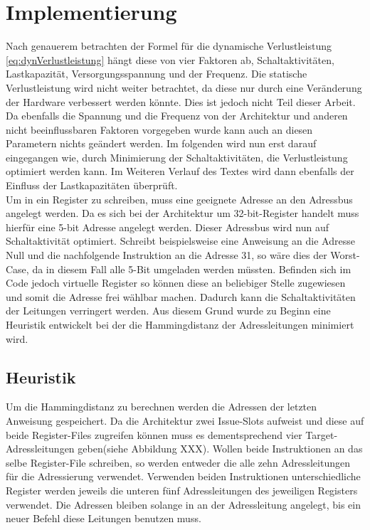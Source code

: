 \chapter{Implementierung}
\label{chap:Implementierung}

Nach genauerem betrachten der Formel für die dynamische Verlustleistung \ref{eq:dynVerlustleistung} hängt diese von vier Faktoren ab, Schaltaktivitäten,  Lastkapazität, Versorgungsspannung und der Frequenz. Die statische Verlustleistung wird nicht weiter betrachtet, da diese nur durch eine Veränderung der Hardware verbessert werden könnte. Dies ist jedoch nicht Teil dieser Arbeit. Da ebenfalls die Spannung und die Frequenz von der Architektur und anderen nicht beeinflussbaren Faktoren vorgegeben wurde kann auch an diesen Parametern nichts geändert werden. Im folgenden wird nun erst darauf eingegangen wie, durch Minimierung der Schaltaktivitäten, die Verlustleistung optimiert werden kann. Im Weiteren Verlauf des Textes wird dann ebenfalls der Einfluss der Lastkapazitäten überprüft.\\
Um in ein Register zu schreiben, muss eine geeignete Adresse an den Adressbus angelegt werden. Da es sich bei der Architektur um 32-bit-Register handelt muss hierfür eine 5-bit Adresse angelegt werden. Dieser Adressbus wird nun auf Schaltaktivität optimiert. Schreibt beispielsweise eine Anweisung an die Adresse Null und die nachfolgende Instruktion an die Adresse 31, so wäre dies der Worst-Case, da in diesem Fall alle 5-Bit umgeladen werden müssten. Befinden sich im Code jedoch virtuelle Register so können diese an beliebiger Stelle zugewiesen und somit die Adresse frei wählbar machen. Dadurch kann die Schaltaktivitäten der Leitungen verringert werden. Aus diesem Grund wurde zu Beginn eine Heuristik entwickelt bei der die Hammingdistanz der Adressleitungen minimiert wird.
\section{Heuristik}
\label{sec:Heuristik}
Um die Hammingdistanz zu berechnen werden die Adressen der letzten Anweisung gespeichert. Da die Architektur zwei Issue-Slots aufweist und diese auf beide Register-Files zugreifen können muss es dementsprechend vier Target-Adressleitungen geben(siehe Abbildung XXX). Wollen beide Instruktionen an das selbe Register-File schreiben, so werden entweder die alle zehn Adressleitungen für die Adressierung verwendet. Verwenden beiden Instruktionen unterschiedliche Register werden jeweils die unteren fünf Adressleitungen des jeweiligen Registers verwendet. Die Adressen bleiben solange in an der Adressleitung angelegt, bis ein neuer Befehl diese Leitungen benutzen muss. 